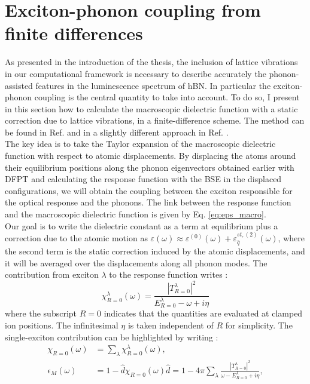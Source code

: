 %
\section{Exciton-phonon coupling from finite differences} \label{sec:excph_fdd}
As presented in the introduction of the thesis, the inclusion of lattice vibrations in our computational framework is necessary to describe accurately the phonon-assisted features in the luminescence spectrum of hBN. In particular the exciton-phonon coupling is the central quantity to take into account. To do so, I present in this section how to calculate the macroscopic dielectric function with a static correction due to lattice vibrations, in a finite-difference scheme. The method can be found in Ref. \cite{paleari2019exciton} and in a slightly different approach in Ref. \cite{cannuccia2019theory}.\\
The key idea is to take the Taylor expansion of the macroscopic dielectric function with respect to atomic displacements. By displacing the atoms around their equilibrium positions along the phonon eigenvectors obtained earlier with \acrshort{DFPT} and calculating the response function with the \acrshort{BSE} in the displaced configurations, we will obtain the coupling between the exciton responsible for the optical response and the phonons. The link between the response function and the macroscopic dielectric function is given by Eq. \eqref{eq:eps_macro}. \\
Our goal is to write the dielectric constant as a term at equilibrium
plus a correction due to the atomic motion as $\varepsilon (\omega)\approx \varepsilon^{(0)}(\omega) + \varepsilon^{st,(2)}_{\bar{q}}(\omega)$, where the second term is the static correction induced by the atomic displacements, and it will be averaged over the displacements along all phonon modes.\cite{zacharias2016one} 
The contribution from exciton $\lambda$ to the response function  writes :
\begin{equation}
	\chi^\lambda_{R=0}(\omega) = \frac{|T^\lambda_{R=0}|^2}{E^\lambda_{R=0} - \omega + i \eta} \label{eq:chi_R_lambda}
\end{equation}
where the subscript $R=0$ indicates that the quantities are evaluated at clamped ion positions. The infinitesimal $\eta$ is taken independent of $R$ for simplicity.
The single-exciton contribution can be highlighted by writing :
\begin{align}
	\chi_{R=0}(\omega)&= \sum_\lambda \chi^\lambda_{R=0} (\omega),  \label{eq:chi} \\
\epsilon_M(\omega)&=1 -  \hat d \chi_{R=0}(\omega) \hat d = 1 - 4\pi\sum_\lambda \frac{ | T_{R=0}^\lambda|^2}{\omega - E^\lambda_{R=0} + i\eta},
\end{align}
